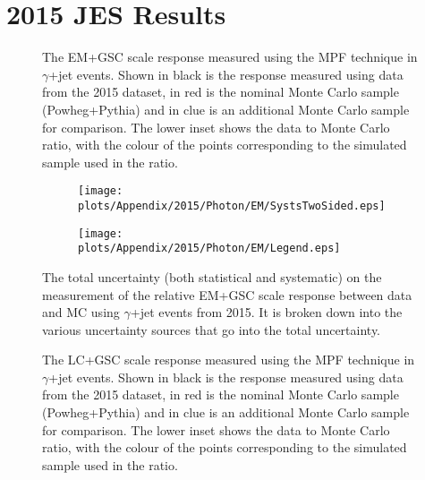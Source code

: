 \chapter{2015 JES Results}
\label{App:2015}

\begin{figure}[!ht]
  \begin{center}
  \end{center}
  \caption[EM scale response using $\gamma$+jet in 2015]
  {\small The EM+GSC scale response measured using the MPF technique in $\gamma$+jet events.  Shown in black is the response measured using data from the 2015 dataset, in red is the nominal Monte Carlo sample (Powheg+Pythia) and in clue is an additional Monte Carlo sample for comparison.  The lower inset shows the data to Monte Carlo ratio, with the colour of the points corresponding to the simulated sample used in the ratio.  }
  \label{plot:GammaJetEM2015App}
\end{figure}


\begin{figure}[!ht]
\captionsetup[subfigure]{labelformat=empty}
 \begin{center}
   \begin{subfigure}{0.55\textwidth}
     \hspace{-3cm}
     \texttt{[image: plots/Appendix/2015/Photon/EM/SystsTwoSided.eps]}
   \end{subfigure}
   \begin{subfigure}{0.55\textwidth}
     \hspace{-3cm}
     \texttt{[image: plots/Appendix/2015/Photon/EM/Legend.eps]}
   \end{subfigure}
 \end{center}
 \caption[Uncertainty on the EM+GSC scale response measurement using $\gamma$+jet]
 {\small The total uncertainty (both statistical and systematic) on the measurement of the relative EM+GSC scale response between data and MC using $\gamma$+jet events from 2015.  It is broken down into the various uncertainty sources that go into the total uncertainty.  }
 \label{Fig:GammaJetSystsEM2015}
\end{figure}

\begin{figure}[!ht]
  \begin{center}
  \end{center}
  \caption[LC scale response using $\gamma$+jet in 2015]
  {\small The LC+GSC scale response measured using the MPF technique in $\gamma$+jet events.  Shown in black is the response measured using data from the 2015 dataset, in red is the nominal Monte Carlo sample (Powheg+Pythia) and in clue is an additional Monte Carlo sample for comparison.  The lower inset shows the data to Monte Carlo ratio, with the colour of the points corresponding to the simulated sample used in the ratio.  }
  \label{plot:GammaJetLC2015App}
\end{figure}


